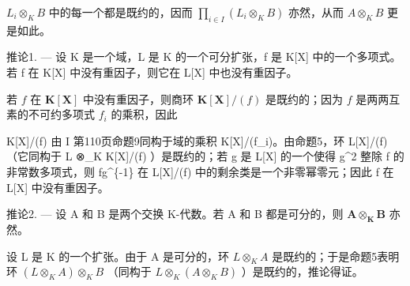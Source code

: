 \(L_{i} \otimes_{K} B\) 中的每一个都是既约的，因而 \(\prod_{i \in I} (L_{i} \otimes_{K} B)\) 亦然，从而 \(A \otimes_{K} B\) 更是如此。

推论1. --- 设 K 是一个域，L 是 K 的一个可分扩张，f 是 K{[}X{]} 中的一个多项式。若 f 在 K{[}X{]} 中没有重因子，则它在 L{[}X{]} 中也没有重因子。

若 \(f\) 在 \(\mathbf{K}[\mathbf{X}]\) 中没有重因子，则商环 \(\mathbf{K}[\mathbf{X}] / (f)\) 是既约的；因为 \(f\) 是两两互素的不可约多项式 \(f_i\) 的乘积，因此

K{[}X{]}/(f) 由 I 第110页命题9同构于域的乘积 K{[}X{]}/(f\_i)。由命题5，环 L{[}X{]}/(f) （它同构于 L ⊗\_K K{[}X{]}/(f) ）是既约的；若 g 是 L{[}X{]} 的一个使得 g\^{}2 整除 f 的非常数多项式，则 fg\^{}\{-1\} 在 L{[}X{]}/(f) 中的剩余类是一个非零幂零元；因此 f 在 L{[}X{]} 中没有重因子。

推论2. --- 设 A 和 B 是两个交换 K-代数。若 A 和 B 都是可分的，则 \(\mathbf{A} \otimes_{\mathbf{K}} \mathbf{B}\) 亦然。

设 L 是 K 的一个扩张。由于 A 是可分的，环 \(L \otimes_{K} A\) 是既约的；于是命题5表明环 \((L \otimes_{K} A) \otimes_{K} B\) （同构于 \(L \otimes_{K} (A \otimes_{K} B)\) ）是既约的，推论得证。

